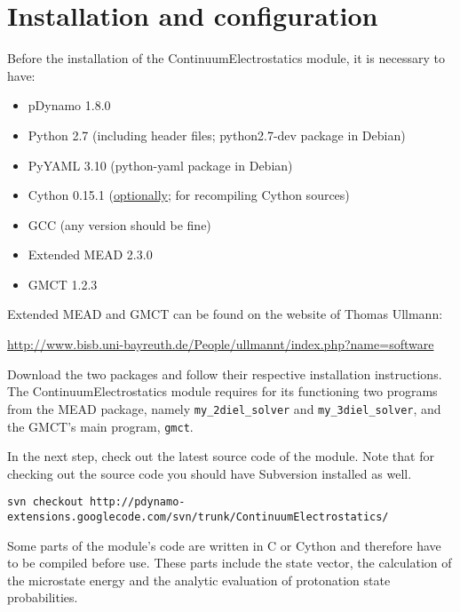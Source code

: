 \documentclass[a4paper,11pt]{article}
\newcommand{\modulename}{ContinuumElectrostatics\xspace}
\begin{document}
\section{Installation and configuration}
Before the installation of the \modulename module, it is necessary
to have:
\begin{itemize}
\itemsep0pt \parskip0pt 
  \item pDynamo 1.8.0
  \item Python 2.7 (including header files; python2.7-dev package in Debian)
  \item PyYAML 3.10 (python-yaml package in Debian)
  \item Cython 0.15.1 (\underline{optionally}; for recompiling Cython sources)
  \item GCC (any version should be fine)
  \item Extended MEAD 2.3.0
  \item GMCT 1.2.3
\end{itemize}
%
Extended MEAD and GMCT can be found on the website of Thomas Ullmann:

\url{http://www.bisb.uni-bayreuth.de/People/ullmannt/index.php?name=software}

Download the two packages and follow their respective installation
instructions.
%
The \modulename module requires for its functioning two programs
from the MEAD package, namely \texttt{my\_2diel\_solver} and \texttt{my\_3diel\_solver},
and the GMCT's main program, \texttt{gmct}.

\bigskip
In the next step, check out the latest source code of the module.
%
Note that for checking out the source code you should have Subversion installed
as well.

{\footnotesize \begin{lstlisting}
svn checkout http://pdynamo-extensions.googlecode.com/svn/trunk/ContinuumElectrostatics/
\end{lstlisting} }

\bigskip
Some parts of the module's code are written in C or Cython and therefore have to be compiled 
before use. 
%
These parts include the state vector, the calculation of the microstate energy and 
the analytic evaluation of protonation state probabilities.
\end{document}
